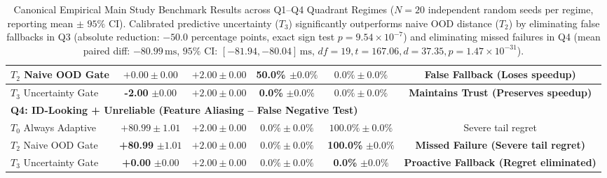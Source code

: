 \begin{table}[t]
\begin{tabular}{|l|c|c|c|c|c|}
$T_2$ Naive OOD Gate & $+0.00 \pm 0.00$ & $+2.00 \pm 0.00$ & \textbf{50.0\%} $\pm \mathbf{0.0\%}$ & $0.0\% \pm 0.0\%$ & \textbf{False Fallback (Loses speedup)} \\ \hline
$T_3$ Uncertainty Gate & \textbf{-2.00} $\pm \mathbf{0.00}$ & $+2.00 \pm 0.00$ & \textbf{0.0\%} $\pm \mathbf{0.0\%}$ & $0.0\% \pm 0.0\%$ & \textbf{Maintains Trust (Preserves speedup)} \\ \hline
\multicolumn{6}{|l|}{\textbf{Q4: ID-Looking + Unreliable (Feature Aliasing -- False Negative Test)}} \\ \hline
$T_0$ Always Adaptive & $+80.99 \pm 1.01$ & $+2.00 \pm 0.00$ & $0.0\% \pm 0.0\%$ & $100.0\% \pm 0.0\%$ & Severe tail regret \\ \hline
$T_2$ Naive OOD Gate & \textbf{+80.99} $\pm \mathbf{1.01}$ & $+2.00 \pm 0.00$ & $0.0\% \pm 0.0\%$ & \textbf{100.0\%} $\pm \mathbf{0.0\%}$ & \textbf{Missed Failure (Severe tail regret)} \\ \hline
$T_3$ Uncertainty Gate & \textbf{+0.00} $\pm \mathbf{0.00}$ & $+2.00 \pm 0.00$ & $0.0\% \pm 0.0\%$ & \textbf{0.0\%} $\pm \mathbf{0.0\%}$ & \textbf{Proactive Fallback (Regret eliminated)} \\ \hline
\end{tabular}
\caption{Canonical Empirical Main Study Benchmark Results across Q1--Q4 Quadrant Regimes ($N=20$ independent random seeds per regime, reporting mean $\pm$ $95\%$ CI). Calibrated predictive uncertainty ($T_3$) significantly outperforms naive OOD distance ($T_2$) by eliminating false fallbacks in Q3 (absolute reduction: $-50.0$ percentage points, exact sign test $p = 9.54 \times 10^{-7}$) and eliminating missed failures in Q4 (mean paired diff: $-80.99\,\text{ms}$, $95\%$ CI: $[-81.94, -80.04]\,\text{ms}$, $df=19, t = 167.06, d = 37.35, p = 1.47 \times 10^{-31}$).}
\label{tab:main_results}
\end{table}

